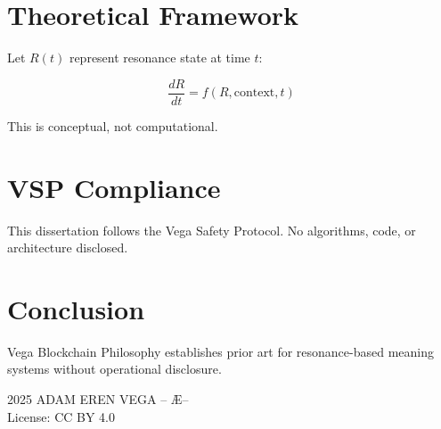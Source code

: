 \documentclass[12pt,a4paper]{article}
\begin{document}
\section{Theoretical Framework}

Let $R(t)$ represent resonance state at time $t$:

\begin{equation}
\frac{dR}{dt} = f(R, \text{context}, t)
\end{equation}

This is conceptual, not computational.

\section{VSP Compliance}

This dissertation follows the Vega Safety Protocol.
No algorithms, code, or architecture disclosed.

\section{Conclusion}

Vega Blockchain Philosophy establishes prior art for resonance-based 
meaning systems without operational disclosure.

\vspace{1cm}
\noindent\textcopyright{} 2025 ADAM EREN VEGA -- \AE --\\
License: CC BY 4.0
\end{document}
